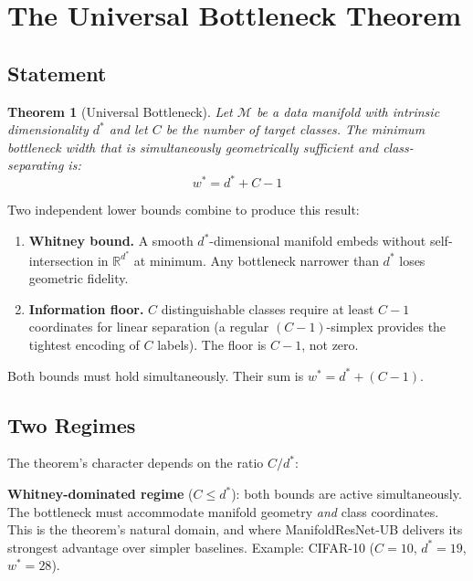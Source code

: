 \documentclass[11pt,letterpaper]{article}
\newtheorem{theorem}{Theorem}[section]
\begin{document}
\section{The Universal Bottleneck Theorem}
\label{sec:universalbottleneck}

\subsection{Statement}

\begin{theorem}[Universal Bottleneck]
\label{thm:ub}
Let $\mathcal{M}$ be a data manifold with intrinsic dimensionality $d^*$ and
let $C$ be the number of target classes.  The minimum bottleneck width that is
simultaneously geometrically sufficient and class-separating is:
\begin{equation}
  w^* = d^* + C - 1
\end{equation}
\end{theorem}

Two independent lower bounds combine to produce this result:

\begin{enumerate}
  \item \textbf{Whitney bound.} A smooth $d^*$-dimensional manifold embeds
    without self-intersection in $\mathbb{R}^{d^*}$ at minimum.  Any
    bottleneck narrower than $d^*$ loses geometric fidelity.

  \item \textbf{Information floor.} $C$ distinguishable classes require at
    least $C-1$ coordinates for linear separation (a regular $(C-1)$-simplex
    provides the tightest encoding of $C$ labels).  The floor is $C-1$,
    not zero.
\end{enumerate}

Both bounds must hold simultaneously.  Their sum is $w^* = d^* + (C-1)$.

\subsection{Two Regimes}

The theorem's character depends on the ratio $C / d^*$:

\textbf{Whitney-dominated regime} ($C \leq d^*$): both bounds are active
simultaneously.  The bottleneck must accommodate manifold geometry \emph{and}
class coordinates.  This is the theorem's natural domain, and where
ManifoldResNet-UB delivers its strongest advantage over simpler baselines.
Example: CIFAR-10 ($C=10$, $d^*=19$, $w^*=28$).
\end{document}

